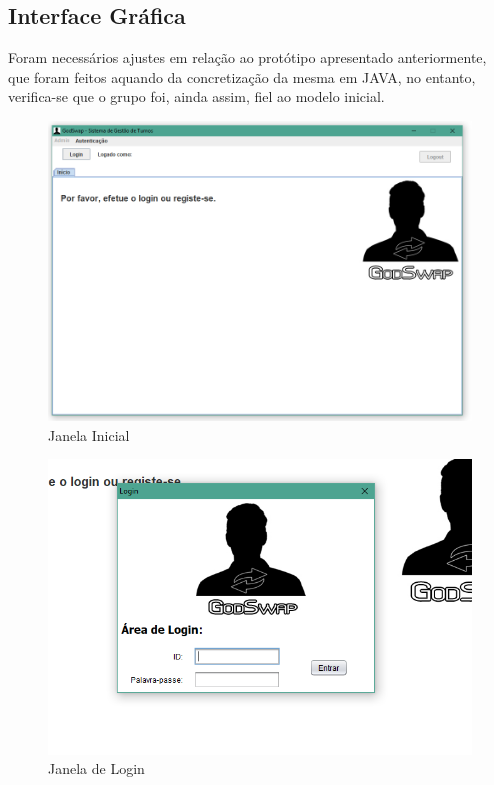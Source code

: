 \documentclass[a4paper]{article}
\begin{document}
\clearpage
\subsection{Interface Gráfica}
\hspace{3mm} Foram necessários ajustes em relação ao protótipo apresentado anteriormente, que foram feitos aquando da concretização da mesma em JAVA, no entanto, verifica-se que o grupo foi, ainda assim, fiel ao modelo inicial.

\begin{figure}[H]
\centering
\includegraphics[width=13.5cm]{IjanelaInicial}
\caption{Janela Inicial}
\label{}
\end{figure}

\begin{figure}[H]
\centering
\includegraphics[width=13.5cm]{Ilogin}
\caption{Janela de Login}
\label{}
\end{figure}
\end{document}
